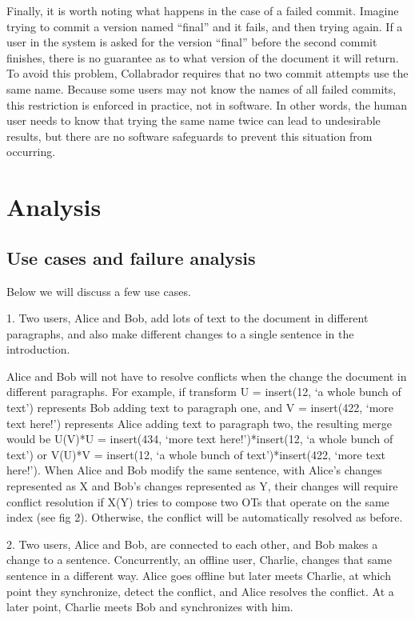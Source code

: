 \documentclass[11pt,titlepage]{article}
\begin{document}
Finally, it is worth noting what happens in the case of a failed
commit. Imagine trying to commit a version named ``final'' and it
fails, and then trying again. If a user in the system is asked for the
version ``final'' before the second commit finishes, there is no
guarantee as to what version of the document it will return. To avoid
this problem, Collabrador requires that no two commit attempts use the
same name. Because some users may not know the names of all failed
commits, this restriction is enforced in practice, not in software. In
other words, the human user needs to know that trying the same name
twice can lead to undesirable results, but there are no software
safeguards to prevent this situation from occurring.

\section{Analysis}

\subsection{Use cases and failure analysis}

Below we will discuss a few use cases.

1. Two users, Alice and Bob, add lots of text to the document in different paragraphs, 
and also make different changes to a single sentence in the introduction. 

Alice and Bob will not have to resolve conflicts when the change the document in
different paragraphs. For example, if transform U = insert(12, ‘a whole bunch of text’)
represents Bob adding text to paragraph one, and V = insert(422, ‘more text here!’)
represents Alice adding text to paragraph two, the resulting merge would be 
U(V)*U =  insert(434, ‘more text here!’)*insert(12, ‘a whole bunch of text’) 
or V(U)*V = insert(12, ‘a whole bunch of text’)*insert(422, ‘more text here!’). 
When Alice and Bob modify the same sentence, with Alice’s changes represented as 
X and Bob’s changes represented as Y, their changes will require conflict resolution
if X(Y) tries to compose two OTs that operate on the same index (see fig 2). Otherwise, 
the conflict will be automatically resolved as before. 
 
2. Two users, Alice and Bob, are connected to each other, and Bob makes a change to a 
sentence. Concurrently, an offline user, Charlie, changes that same sentence in a 
different way. Alice goes offline but later meets Charlie, at which point they 
synchronize, detect the conflict, and Alice resolves the conflict. At a later point,
Charlie meets Bob and synchronizes with him.
  
\end{document}
